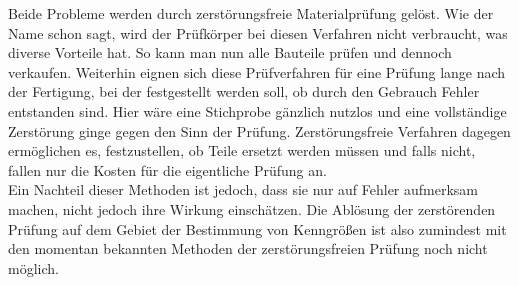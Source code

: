 \documentclass[reducespace,stylepage,semiarbeit]{spezidoc}
\begin{document}
Beide Probleme werden durch zerstörungsfreie Materialprüfung gelöst. 
Wie der Name schon sagt, wird der Prüfkörper bei diesen Verfahren nicht verbraucht, was diverse Vorteile hat. 
So kann man nun alle Bauteile prüfen und dennoch verkaufen. 
Weiterhin  eignen sich diese Prüfverfahren für eine Prüfung lange nach der Fertigung, bei der festgestellt werden soll, ob durch den Gebrauch Fehler entstanden sind. 
Hier wäre eine Stichprobe gänzlich nutzlos und eine vollständige Zerstörung ginge gegen den Sinn der Prüfung. 
Zerstörungsfreie Verfahren dagegen ermöglichen es, festzustellen, ob Teile ersetzt werden müssen und falls nicht, fallen nur die Kosten für die eigentliche Prüfung an.\\
Ein Nachteil dieser Methoden ist jedoch, dass sie nur auf Fehler aufmerksam machen, nicht jedoch ihre Wirkung einschätzen. 
Die Ablösung der zerstörenden Prüfung auf dem Gebiet der Bestimmung von Kenngrößen ist also zumindest mit den momentan bekannten Methoden der zerstörungsfreien Prüfung noch nicht möglich.
\end{document}
